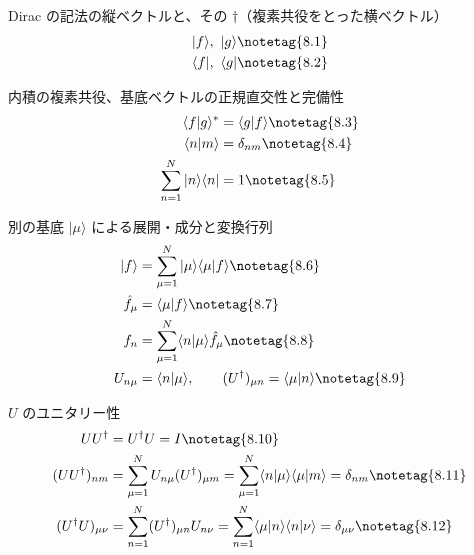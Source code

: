 \documentclass[uplatex,dvipdfmx,a4paper,11pt]{jsarticle}
\begin{document}
\begin{kirokuichiran}
\end{kirokuichiran}

\youtenseiri
\begin{noteshikilist}
  \item Dirac の記法の縦ベクトルと、その $\dagger$（複素共役をとった横ベクトル） %
\begin{align*}
&|f\rangle,\ |g\rangle \notetag{8.1}\\
&\langle f|,\ \langle g| \notetag{8.2}
\end{align*}
  \item 内積の複素共役、基底ベクトルの正規直交性と完備性 %
\begin{align*}
\langle f|g\rangle^{*}&=\langle g|f\rangle \notetag{8.3}\\
\langle n|m\rangle&=\delta_{nm} \notetag{8.4}\\
\sum_{n=1}^{N}|n\rangle\langle n|&=1 \notetag{8.5}
\end{align*}
  \item 別の基底 $|\mu\rangle$ による展開・成分と変換行列 %
\begin{align*}
|f\rangle&=\sum_{\mu=1}^{N}|\mu\rangle\langle\mu|f\rangle \notetag{8.6}\\
\hat{f}_{\mu}&=\langle\mu|f\rangle \notetag{8.7}\\
f_n&=\sum_{\mu=1}^{N}\langle n|\mu\rangle\hat{f}_{\mu} \notetag{8.8}\\
U_{n\mu}&=\langle n|\mu\rangle,\qquad (U^{\dagger})_{\mu n}=\langle\mu|n\rangle \notetag{8.9}
\end{align*}
  \item $U$ のユニタリー性 %
\begin{align*}
UU^{\dagger}&=U^{\dagger}U=I \notetag{8.10}\\
(UU^{\dagger})_{nm}&=\sum_{\mu=1}^{N}U_{n\mu}(U^{\dagger})_{\mu m}=\sum_{\mu=1}^{N}\langle n|\mu\rangle\langle\mu|m\rangle=\delta_{nm} \notetag{8.11}\\
(U^{\dagger}U)_{\mu\nu}&=\sum_{n=1}^{N}(U^{\dagger})_{\mu n}U_{n\nu}=\sum_{n=1}^{N}\langle\mu|n\rangle\langle n|\nu\rangle=\delta_{\mu\nu} \notetag{8.12}
\end{align*}
\end{noteshikilist}
\end{document}
